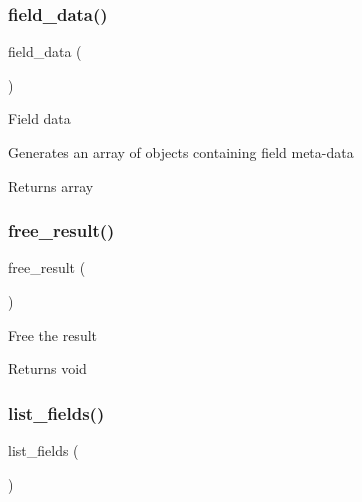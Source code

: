 \subsubsection{\texorpdfstring{field\+\_\+data()}{field\_data()}}
{\footnotesize\ttfamily field\+\_\+data (\begin{DoxyParamCaption}{ }\end{DoxyParamCaption})}

Field data

Generates an array of objects containing field meta-\/data

\begin{DoxyReturn}{Returns}
array 
\end{DoxyReturn}
\mbox{\label{class_c_i___d_b__sqlsrv__result_aad2d98d6beb3d6095405356c6107b473}} 
\subsubsection{\texorpdfstring{free\+\_\+result()}{free\_result()}}
{\footnotesize\ttfamily free\+\_\+result (\begin{DoxyParamCaption}{ }\end{DoxyParamCaption})}

Free the result

\begin{DoxyReturn}{Returns}
void 
\end{DoxyReturn}
\mbox{\label{class_c_i___d_b__sqlsrv__result_a50b54eb4ea7cfd039740f532988ea776}} 
\subsubsection{\texorpdfstring{list\+\_\+fields()}{list\_fields()}}
{\footnotesize\ttfamily list\+\_\+fields (\begin{DoxyParamCaption}{ }\end{DoxyParamCaption})}

